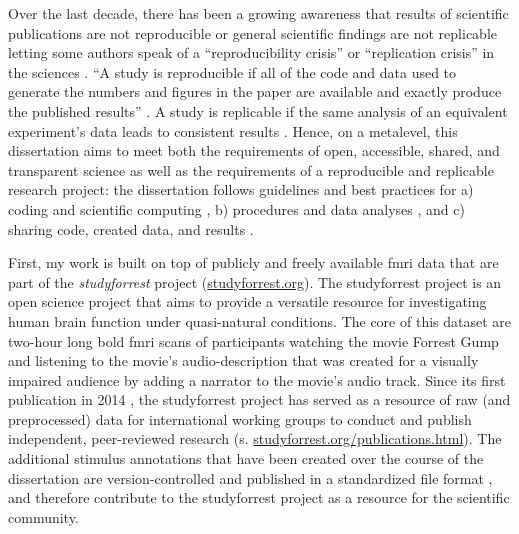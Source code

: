 Over the last decade, there has been a growing awareness that results of
scientific publications are not reproducible or general scientific findings are
not replicable letting some authors speak of a ``reproducibility crisis'' or
``replication crisis'' in the sciences \citep{baker2016reproducibility,
plesser2018reproducibility, stupple2019reproducibility, nosek2022replicability}.
``A study is reproducible if all of the code and data used to generate the
numbers and figures in the paper are available and exactly produce the published
results'' \citep{leek2017most}.
A study is replicable if the same analysis of an equivalent experiment's data
leads to consistent results \citep{dubois2016building, leek2017most}.
%
Hence, on a metalevel, this dissertation aims to meet both the requirements of
open, accessible, shared, and transparent science \citep{watson2015will,
fecher2014open} as well as the requirements of a reproducible and replicable
research project:
%
the dissertation follows guidelines and best practices for a) coding and
scientific computing \citep{wilson2014best}, b) procedures and data analyses
\citep{nichols2017best, poldrack2017scanning, poldrack2019establishment}, and c)
sharing code, created data, and results \citep{eglen2017toward, nichols2017best,
pernet2015improving}.


First, my work is built on top of publicly and freely available \ac{fmri} data
that are part of the \textit{studyforrest} project
(\href{www.studyforrest.org}{\url{studyforrest.org}}).
%
The studyforrest project is an open science project that aims to provide a
versatile resource for investigating human brain function under quasi-natural
conditions.
The core of this dataset are two-hour long \ac{bold} \ac{fmri} scans of
participants watching the movie Forrest Gump \citep{ForrestGumpMovie} and
listening to the movie's audio-description that was created for a visually
impaired audience by adding a narrator to the movie's audio track.
Since its first publication in 2014 \citep{hanke2014audiomovie}, the
studyforrest project has served as a resource of raw (and preprocessed) data for
international working groups to conduct and publish independent, peer-reviewed
research (s.
\href{www.studyforrest.org/publications.html}{\url{studyforrest.org/publications.html}}).
The additional stimulus annotations that have been created over the course of
the dissertation are version-controlled and published in a standardized file
format \citep{haeusler2021speechanno}, and therefore contribute to the
studyforrest project as a resource for the scientific community.

